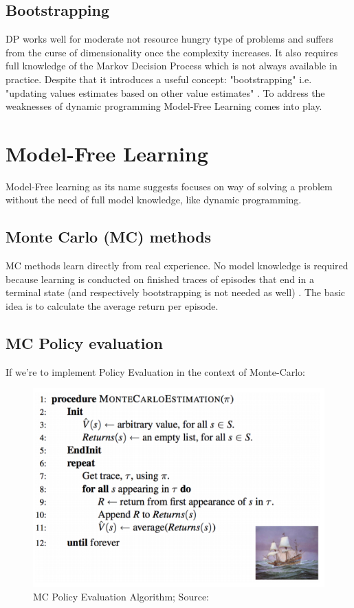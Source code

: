 \subsection{Bootstrapping}

DP works well for moderate not resource hungry type of problems and suffers from the curse of dimensionality once the complexity increases. It also requires full knowledge of the Markov Decision Process which is not always available in practice. Despite that it introduces a useful concept: "bootstrapping" i.e. "updating values estimates based on other value estimates" \cite{lecture_dp}. To address the weaknesses
of dynamic programming Model-Free Learning comes into play.

\section{Model-Free Learning}
Model-Free learning as its name suggests focuses on way
of solving a problem without the need of full model knowledge,
like dynamic programming. 
\subsection{Monte Carlo (MC) methods}

MC methods learn directly from real experience. No model knowledge is required because learning is conducted on finished traces of episodes that end in a terminal state (and respectively bootstrapping is not needed as well) \cite{lecture_mfl} . The basic idea is to calculate the average return per episode.

\subsection{MC Policy evaluation}
If we're to implement Policy Evaluation in the context of Monte-Carlo:
\begin{figure}[H]
  \centering
  \includegraphics[scale=0.5]{figures/mc_policy_evaluation.PNG}
  \caption{MC Policy Evaluation Algorithm; Source: \cite{lecture_mfl}}
  \label{fig:via}
\end{figure}

